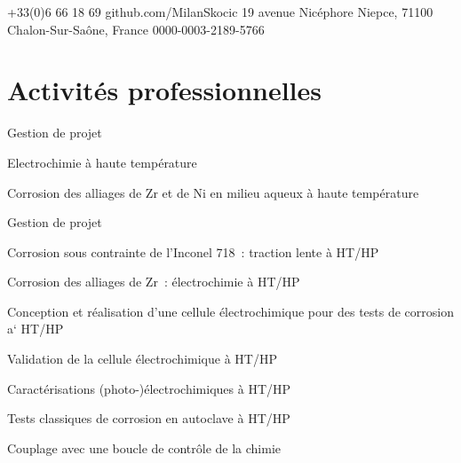 \documentclass[11pt, a4paper, notitlepage]{article}
\begin{document}
\selectfont
\pagestyle{empty}
	\newpage
	
	
	
	{+33(0)6 66 18 69}
	{github.com/MilanSkocic}
	{19 avenue Nicéphore Niepce, 71100 Chalon-Sur-Saône, France}
	{0000-0003-2189-5766}


	\section*{Activités professionnelles}
	\begin{jobdetails}		
		\item Gestion de projet
		\item Electrochimie à haute température
		\item Corrosion des alliages de Zr et de Ni en milieu aqueux à haute température
	\end{jobdetails}

	\begin{jobdetails}
		\item Gestion de projet
		\item Corrosion sous contrainte de l’Inconel 718 : traction lente à HT/HP
		\item Corrosion des alliages de Zr : électrochimie à HT/HP
	\end{jobdetails}

        \begin{jobdetails}	
		\item Conception et réalisation d’une cellule électrochimique pour des tests de corrosion a` HT/HP
		\item Validation de la cellule électrochimique à HT/HP
		\item Caractérisations (photo-)électrochimiques à HT/HP
		\item Tests classiques de corrosion en autoclave à HT/HP
		\item Couplage avec une boucle de contrôle de la chimie
	\end{jobdetails}
	
\end{document}
